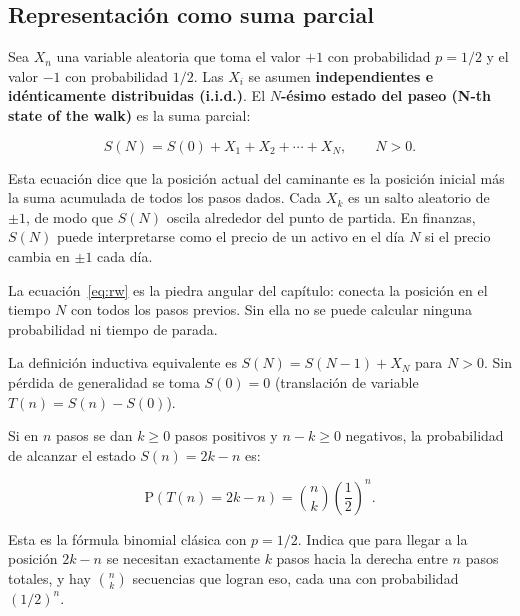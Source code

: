\documentclass[12pt]{article}
\begin{document}
\subsection{Representaci\'on como suma parcial}

Sea $X_n$ una variable aleatoria que toma el valor $+1$ con probabilidad
$p = 1/2$ y el valor $-1$ con probabilidad $1/2$.
Las $X_i$ se asumen \textbf{independientes e id\'enticamente distribuidas (i.i.d.)}.
El \textbf{$N$-\'esimo estado del paseo (N-th state of the walk)} es la suma parcial:

\begin{equation}
  S(N) = S(0) + X_1 + X_2 + \cdots + X_N, \qquad N > 0.
  \label{eq:rw}
\end{equation}

\begin{intuicionmat}
Esta ecuaci\'on dice que la posici\'on actual del caminante es la posici\'on
inicial m\'as la suma acumulada de todos los pasos dados. Cada $X_k$ es
un salto aleatorio de $\pm 1$, de modo que $S(N)$ oscila alrededor del
punto de partida. En finanzas, $S(N)$ puede interpretarse como el precio
de un activo en el d\'ia $N$ si el precio cambia en $\pm 1$ cada d\'ia.
\end{intuicionmat}

\begin{intuicion}
La ecuaci\'on~\eqref{eq:rw} es la piedra angular del cap\'itulo: conecta la posici\'on
en el tiempo $N$ con todos los pasos previos. Sin ella no se puede calcular ninguna
probabilidad ni tiempo de parada.
\end{intuicion}

La definici\'on inductiva equivalente es $S(N) = S(N-1) + X_N$ para $N > 0$.
Sin p\'erdida de generalidad se toma $S(0) = 0$ (translaci\'on de variable
$T(n) = S(n) - S(0)$).

Si en $n$ pasos se dan $k \geq 0$ pasos positivos y $n-k \geq 0$ negativos,
la probabilidad de alcanzar el estado $S(n) = 2k - n$ es:

\begin{equation}
  \mathrm{P}\!\left(T(n) = 2k - n\right) = \binom{n}{k}\!\left(\frac{1}{2}\right)^{\!n}.
  \label{eq:binom}
\end{equation}

\begin{intuicionmat}
Esta es la f\'ormula binomial cl\'asica con $p = 1/2$. Indica que para llegar
a la posici\'on $2k-n$ se necesitan exactamente $k$ pasos hacia la derecha entre
$n$ pasos totales, y hay $\binom{n}{k}$ secuencias que logran eso, cada una con
probabilidad $(1/2)^n$.
\end{intuicionmat}
\end{document}
